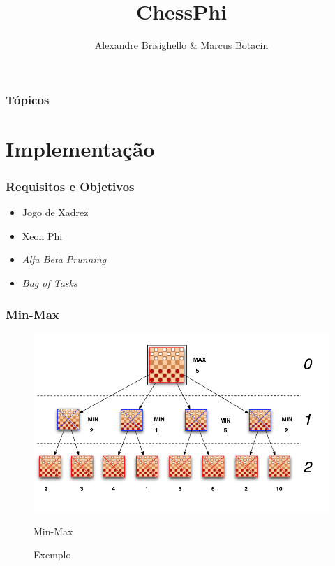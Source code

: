 \documentclass[yellow]{beamer}
\title{ChessPhi}
\author{\underline{Alexandre Brisighello \& Marcus Botacin}}
\begin{document}
\frame{
	\titlepage
}


\begin{frame}
 \frametitle{Tópicos}
 \tableofcontents
\end{frame}

\section{Implementação}


\begin{frame}
  \frametitle{Requisitos e Objetivos}

\begin{itemize}
\item Jogo de Xadrez
\item Xeon Phi
\item \textit{Alfa Beta Prunning}
\item \textit{Bag of Tasks}
\end{itemize}
\end{frame}

\begin{frame}
  \frametitle{Min-Max}
  \begin{figure}[!hpbt]
	  \centering
	  \begin{minipage}{1\textwidth}
		    \centering
		      \includegraphics[width=.8\linewidth]{minimax.png}
		        \caption{Exemplo}{Min-Max}
			  \label{fig:1}
		  \end{minipage}
	  \end{figure}
  \end{frame}
\end{document}
